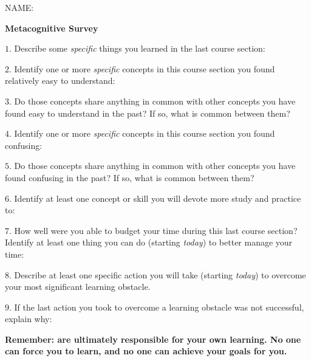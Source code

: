 

\noindent
NAME: \underbar{\hskip 150pt}

\centerline{\bf Metacognitive Survey} 

\medskip
\goodbreak
\item{$1.$} Describe some {\it specific} things you learned in the last course section:
\vskip 40pt
\goodbreak
\item{$2.$} Identify one or more {\it specific} concepts in this course section you found relatively easy to understand:
\vskip 40pt
\goodbreak
\item{$3.$} Do those concepts share anything in common with other concepts you have found easy to understand in the past?  If so, what is common between them?
\vskip 40pt
\goodbreak
\item{$4.$} Identify one or more {\it specific} concepts in this course section you found confusing:
\vskip 40pt
\goodbreak
\item{$5.$} Do those concepts share anything in common with other concepts you have found confusing in the past?  If so, what is common between them?
\vskip 40pt
\goodbreak
\item{$6.$} Identify at least one concept or skill you will devote more study and practice to:
\vskip 40pt
\goodbreak
\item{$7.$} How well were you able to budget your time during this last course section?  Identify at least one thing you can do (starting {\it today}) to better manage your time: 
\vskip 40pt
\goodbreak
\item{$8.$} Describe at least one specific action you will take (starting {\it today}) to overcome your most significant learning obstacle.
\vskip 40pt
\goodbreak
\item{$9.$} If the last action you took to overcome a learning obstacle was not successful, explain why:
\vskip 40pt
\medskip

{\bf Remember:  are ultimately responsible for your own learning.  No one can force you to learn, and no one can achieve your goals for you.}

\vskip 10pt


\vfil \eject






